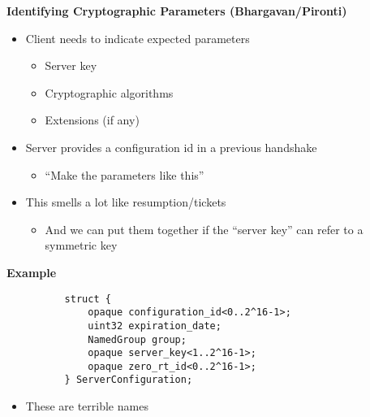 \documentclass[helvetica]{seminar}
\newcommand{\heading}[1]{%
  \begin{center} 
    \large\bf 
    #1 
  \end{center} 
  \vspace{.4 in}}
\begin{document}
\begin{slide}
\heading{Identifying Cryptographic Parameters (Bhargavan/Pironti)}

\begin{itemize}
\item Client needs to indicate expected parameters
  \begin{itemize}
  \item Server key
  \item Cryptographic algorithms
  \item Extensions (if any)
  \end{itemize}

\item Server provides a configuration id in a previous handshake
  \begin{itemize}
  \item ``Make the parameters like this''
  \end{itemize}

\item This smells a lot like resumption/tickets
  \begin{itemize}
  \item And we can put them together if the ``server key'' can refer to a symmetric key
  \end{itemize}
\end{itemize}
\end{slide}

\begin{slide}
\heading{Example}

{\scriptsize
\begin{verbatim}
          struct {
              opaque configuration_id<0..2^16-1>;
              uint32 expiration_date;
              NamedGroup group;
              opaque server_key<1..2^16-1>;
              opaque zero_rt_id<0..2^16-1>;
          } ServerConfiguration;
\end{verbatim}

\begin{itemize}
\item These are terrible names
\end{itemize}
}
\end{slide}
\end{document}
